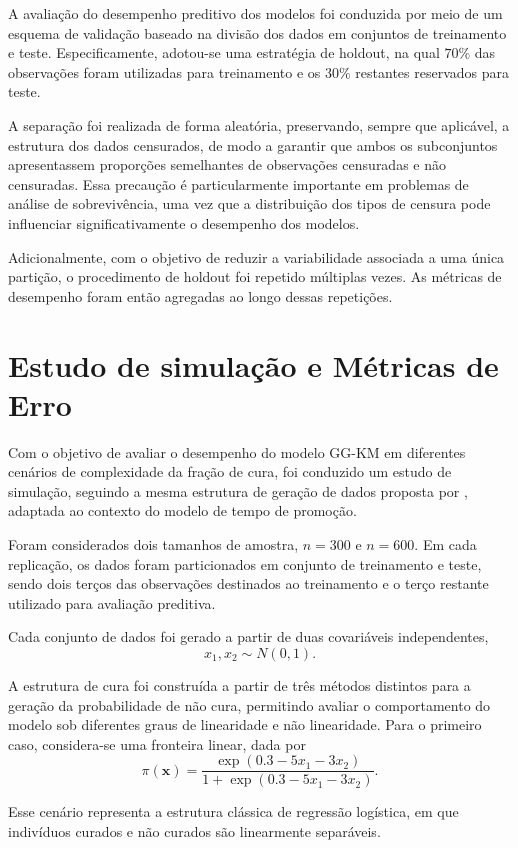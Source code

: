 A avaliação do desempenho preditivo dos modelos foi conduzida por meio de um esquema de
validação baseado na divisão dos dados em conjuntos de treinamento e teste. Especificamente,
adotou-se uma estratégia de holdout, na qual $70\%$ das observações foram utilizadas para
treinamento e os $30\%$ restantes reservados para teste.

A separação foi realizada de forma aleatória, preservando, sempre que aplicável, a estrutura
dos dados censurados, de modo a garantir que ambos os subconjuntos apresentassem proporções
semelhantes de observações censuradas e não censuradas. Essa precaução é particularmente
importante em problemas de análise de sobrevivência, uma vez que a distribuição dos tipos de
censura pode influenciar significativamente o desempenho dos modelos.

Adicionalmente, com o objetivo de reduzir a variabilidade associada a uma única partição,
o procedimento de holdout foi repetido múltiplas vezes. As métricas de desempenho foram então agregadas ao longo dessas
repetições.

\section{Estudo de simulação e Métricas de Erro}

Com o objetivo de avaliar o desempenho do modelo GG-KM em diferentes cenários de complexidade da fração
de cura, foi conduzido um estudo de simulação, seguindo a mesma estrutura de geração
de dados proposta por , adaptada ao contexto do modelo de tempo de promoção.

Foram considerados dois tamanhos de amostra, $n=300$ e $n=600$. Em cada replicação, os dados foram
particionados em conjunto de treinamento e teste, sendo dois terços das observações destinados ao
treinamento e o terço restante utilizado para avaliação preditiva.

Cada conjunto de dados foi gerado a partir de duas covariáveis independentes,
\[
x_1,x_2 \sim N(0,1).
\]

A estrutura de cura foi construída a partir de três métodos distintos para a geração da probabilidade
de não cura, permitindo avaliar o comportamento do modelo sob diferentes graus de linearidade e não
linearidade. Para o primeiro caso, considera-se uma fronteira linear, dada por
\[
\pi(\mathbf{x})
=
\frac{\exp(0.3-5x_1-3x_2)}
{1+\exp(0.3-5x_1-3x_2)}.
\]

Esse cenário representa a estrutura clássica de regressão logística, em que indivíduos curados e não curados são linearmente separáveis.

